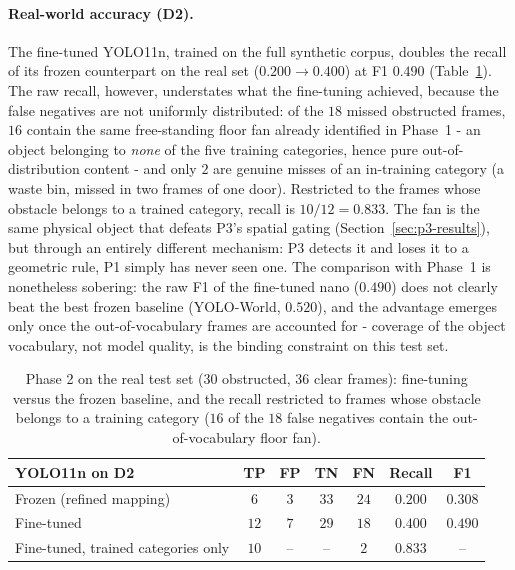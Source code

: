 \paragraph{Real-world accuracy (D2).} The fine-tuned YOLO11n, trained on the
full synthetic corpus, doubles the recall of its frozen counterpart on the real
set ($0.200 \to 0.400$) at F1 $0.490$ (Table~\ref{tab:p1-ft-poli}). The raw
recall, however, understates what the fine-tuning achieved, because the false
negatives are not uniformly distributed: of the $18$ missed obstructed frames,
$16$ contain the same free-standing floor fan already identified in Phase~1 -
an object belonging to \emph{none} of the five training categories, hence pure
out-of-distribution content - and only $2$ are genuine misses of an in-training
category (a waste bin, missed in two frames of one door). Restricted to the
frames whose obstacle belongs to a trained category, recall is $10/12 = 0.833$.
The fan is the same physical object that defeats P3's spatial gating
(Section~\ref{sec:p3-results}), but through an entirely different mechanism:
P3 detects it and loses it to a geometric rule, P1 simply has never seen one.
The comparison with Phase~1 is nonetheless sobering: the raw F1 of the
fine-tuned nano ($0.490$) does not clearly beat the best frozen baseline
(YOLO-World, $0.520$), and the advantage emerges only once the
out-of-vocabulary frames are accounted for - coverage of the object vocabulary,
not model quality, is the binding constraint on this test set.

\begin{table}[h]
  \centering
  \begin{tabular}{lcccccc}
    \hline
    YOLO11n on D2 & TP & FP & TN & FN & Recall & F1 \\
    \hline
    Frozen (refined mapping) & $6$ & $3$ & $33$ & $24$ & $0.200$ & $0.308$ \\
    Fine-tuned & $12$ & $7$ & $29$ & $18$ & $0.400$ & $0.490$ \\
    Fine-tuned, trained categories only & $10$ & -- & -- & $2$ & $0.833$ & -- \\
    \hline
  \end{tabular}
  \caption{Phase 2 on the real test set ($30$ obstructed, $36$ clear frames):
  fine-tuning versus the frozen baseline, and the recall restricted to frames
  whose obstacle belongs to a training category ($16$ of the $18$ false
  negatives contain the out-of-vocabulary floor fan).}
  \label{tab:p1-ft-poli}
\end{table}

